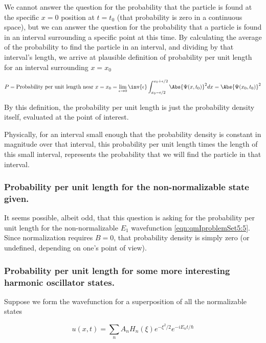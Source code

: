 We cannot answer the question for the probability that the particle is found at the specific $x=0$ position at $t=t_0$ (that probability is zero in a continuous space), but we can answer the question for the probability that a particle is found in an interval surrounding a specific point at this time.  By calculating the average of the probability to find the particle in an interval, and dividing by that interval's length, we arrive at plausible definition of probability per unit length for an interval surrounding $x = x_0$

\begin{equation}\label{eqn:qmIproblemSet5:17}
P = \text{Probability per unit length near $x = x_0$} =
\lim_{\epsilon \rightarrow 0} \inv{\epsilon} \int_{x_0 - \epsilon/2}^{x_0 + \epsilon/2} \Abs{ \Psi(x, t_0) }^2 dx = \Abs{\Psi(x_0, t_0)}^2
\end{equation}

By this definition, the probability per unit length is just the probability density itself, evaluated at the point of interest.

Physically, for an interval small enough that the probability density is constant in magnitude over that interval, this probability per unit length times the length of this small interval, represents the probability that we will find the particle in that interval.

\subsubsection{Probability per unit length for the non-normalizable state given.}

It seems possible, albeit odd, that this question is asking for the probability per unit length for the non-normalizable $E_1$ wavefunction \ref{eqn:qmIproblemSet5:5}.  Since normalization requires $B=0$, that probability density is simply zero (or undefined, depending on one's point of view).

\subsubsection{Probability per unit length for some more interesting harmonic oscillator states.}

Suppose we form the wavefunction for a superposition of all the normalizable states

\begin{equation}\label{eqn:qmIproblemSet5:20}
u(x,t) = \sum_n A_n H_n(\xi) e^{-\xi^2/2} e^{-i E_n t/\hbar}
\end{equation}

